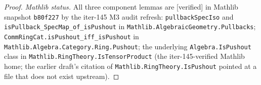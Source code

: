 \begin{proof}
  \emph{Mathlib status.} All three component lemmas are [verified] in Mathlib snapshot \texttt{b80f227} by the iter-145 M3 audit refresh: \texttt{pullbackSpecIso} and \texttt{isPullback\_SpecMap\_of\_isPushout} in \texttt{Mathlib.AlgebraicGeometry.Pullbacks}; \texttt{CommRingCat.isPushout\_iff\_isPushout} in \texttt{Mathlib.Algebra.Category.Ring.Pushout}; the underlying \texttt{Algebra.IsPushout} class in \texttt{Mathlib.RingTheory.IsTensorProduct} (the iter-145-verified Mathlib home; the earlier draft's citation of \texttt{Mathlib.RingTheory.IsPushout} pointed at a file that does not exist upstream).
\end{proof}

\begin{theorem}\leanok
[(ii-\(\beta\)-core) Per-chart translation-invariance K\"ahler-derivation: \(\mathrm df = 0\) factors through the base field]
  \label{lem:chart_algebra_df_zero_factors_through_constant_on_chart}
  

\end{theorem}
